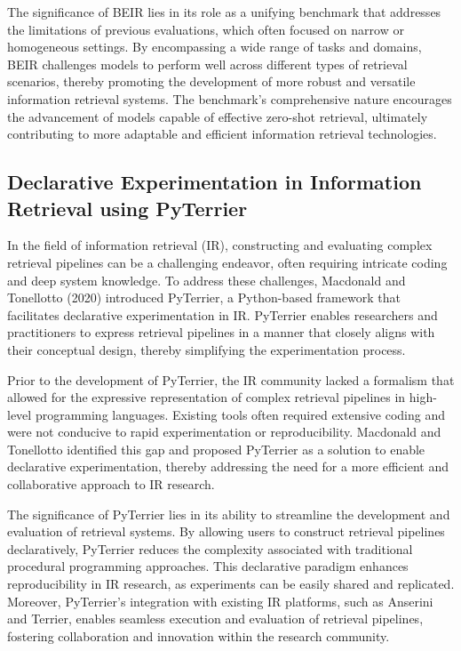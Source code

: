 The significance of BEIR lies in its role as a unifying benchmark that addresses the limitations of previous evaluations, which often focused on narrow or homogeneous settings. By encompassing a wide range of tasks and domains, BEIR challenges models to perform well across different types of retrieval scenarios, thereby promoting the development of more robust and versatile information retrieval systems. The benchmark's comprehensive nature encourages the advancement of models capable of effective zero-shot retrieval, ultimately contributing to more adaptable and efficient information retrieval technologies.



\subsection{Declarative Experimentation in Information Retrieval using PyTerrier}

\noindent In the field of information retrieval (IR), constructing and evaluating complex retrieval pipelines can be a challenging endeavor, often requiring intricate coding and deep system knowledge. To address these challenges, Macdonald and Tonellotto (2020) introduced PyTerrier, a Python-based framework that facilitates declarative experimentation in IR. PyTerrier enables researchers and practitioners to express retrieval pipelines in a manner that closely aligns with their conceptual design, thereby simplifying the experimentation process.

Prior to the development of PyTerrier, the IR community lacked a formalism that allowed for the expressive representation of complex retrieval pipelines in high-level programming languages. Existing tools often required extensive coding and were not conducive to rapid experimentation or reproducibility. Macdonald and Tonellotto identified this gap and proposed PyTerrier as a solution to enable declarative experimentation, thereby addressing the need for a more efficient and collaborative approach to IR research. 

The significance of PyTerrier lies in its ability to streamline the development and evaluation of retrieval systems. By allowing users to construct retrieval pipelines declaratively, PyTerrier reduces the complexity associated with traditional procedural programming approaches. This declarative paradigm enhances reproducibility in IR research, as experiments can be easily shared and replicated. Moreover, PyTerrier's integration with existing IR platforms, such as Anserini and Terrier, enables seamless execution and evaluation of retrieval pipelines, fostering collaboration and innovation within the research community.

